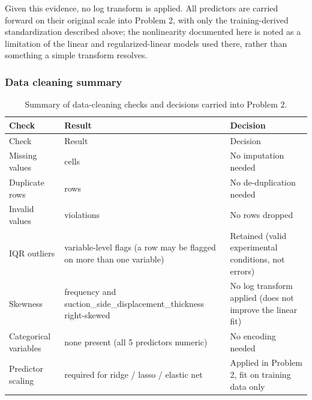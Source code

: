 \documentclass[
  11pt,
]{article}
\newcounter{none} %
\begin{document}
Given this evidence, no log transform is applied. All predictors are
carried forward on their original scale into Problem 2, with only the
training-derived standardization described above; the nonlinearity
documented here is noted as a limitation of the linear and
regularized-linear models used there, rather than something a simple
transform resolves.

\subsubsection{Data cleaning summary}\label{data-cleaning-summary}

\begin{longtable}[]{@{}
  >{\raggedright\arraybackslash}p{}
  >{\raggedright\arraybackslash}p{}
  >{\raggedright\arraybackslash}p{}@{}}
\caption{Summary of data-cleaning checks and decisions carried into
Problem 2.}\tabularnewline
\toprule\noalign{}
\begin{minipage}[b]{\linewidth}\raggedright
Check
\end{minipage} & \begin{minipage}[b]{\linewidth}\raggedright
Result
\end{minipage} & \begin{minipage}[b]{\linewidth}\raggedright
Decision
\end{minipage} \\
\midrule\noalign{}
\endfirsthead
\toprule\noalign{}
\begin{minipage}[b]{\linewidth}\raggedright
Check
\end{minipage} & \begin{minipage}[b]{\linewidth}\raggedright
Result
\end{minipage} & \begin{minipage}[b]{\linewidth}\raggedright
Decision
\end{minipage} \\
\midrule\noalign{}
\endhead
\bottomrule\noalign{}
\endlastfoot
Missing values & 0 cells & No imputation needed \\
Duplicate rows & 0 rows & No de-duplication needed \\
Invalid values & 0 violations & No rows dropped \\
IQR outliers & 209 variable-level flags (a row may be flagged on more
than one variable) & Retained (valid experimental conditions, not
errors) \\
Skewness & frequency and suction\_side\_displacement\_thickness
right-skewed & No log transform applied (does not improve the linear
fit) \\
Categorical variables & none present (all 5 predictors numeric) & No
encoding needed \\
Predictor scaling & required for ridge / lasso / elastic net & Applied
in Problem 2, fit on training data only \\
\end{longtable}
\end{document}
